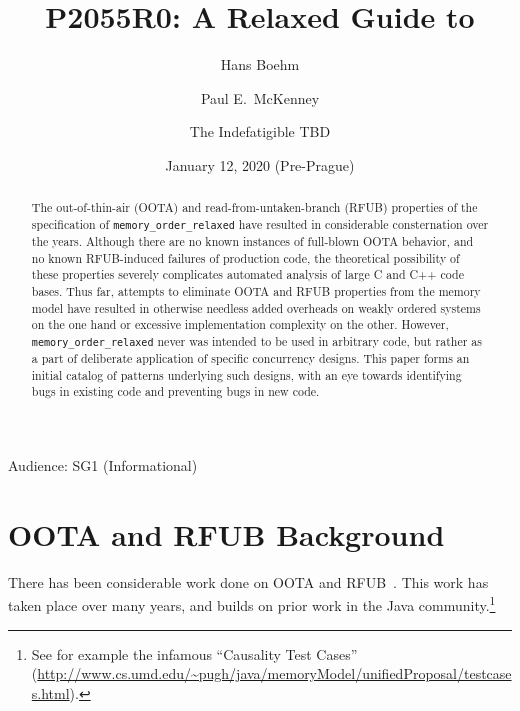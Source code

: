 \documentclass[10]{article}
\begin{document}
\title{P2055R0: A Relaxed Guide to }

\newcommand{\co}[1]{\lstinline[breaklines=yes,breakatwhitespace=yes]{#1}}

\author{
Hans Boehm\\ \and
Paul E.~McKenney\\ \and
The Indefatigible TBD
}
\date{January 12, 2020 (Pre-Prague)}
\maketitle{}

Audience: SG1 (Informational)

\begin{abstract}
	The out-of-thin-air (OOTA) and read-from-untaken-branch (RFUB)
	properties of the specification of \co{memory_order_relaxed}
	have resulted in considerable consternation over the years.
	Although there are no known instances of full-blown OOTA
	behavior, and no known RFUB-induced failures of production code,
	the theoretical possibility of these properties severely
	complicates automated analysis of large C and C++ code bases.
	Thus far, attempts to eliminate OOTA and RFUB properties from
	the memory model have resulted in otherwise needless added
	overheads on weakly ordered systems on the one hand or
	excessive implementation complexity on the other.
	However, \co{memory_order_relaxed} never was intended to be used
	in arbitrary code, but rather as a part of deliberate application
	of specific concurrency designs.
	This paper forms an initial catalog of patterns underlying such
	designs, with an eye towards identifying bugs in existing code
	and preventing bugs in new code.
\end{abstract}

\section{OOTA and RFUB Background}
\label{sec:OOTA and RFUB Background}

There has been considerable work done on OOTA and
RFUB~\cite{Boehm:2014:OGA:2618128.2618134,PaulEMcKenney2016OOTA,Lahav:2017:RSC:3062341.3062352,Sinclair:2017:CAR:3079856.3080206,HansBoehm2019OOTArevisitedAgain,MarkBatty2019ModularRelaxedDependenciesOOTA}.
This work has taken place over many years, and builds on prior work
in the Java community.\footnote{
	See for example the infamous ``Causality Test Cases''
	(\url{http://www.cs.umd.edu/~pugh/java/memoryModel/unifiedProposal/testcases.html}).}
\end{document}
